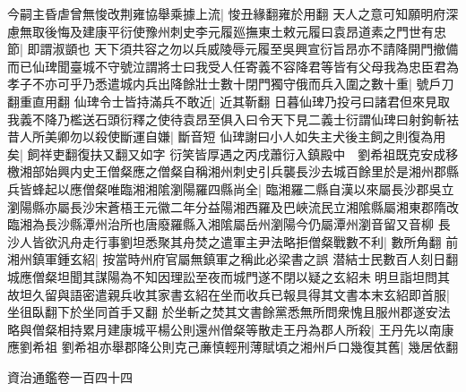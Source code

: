 今嗣主昏虐曾無悛改荆雍協舉乘據上流|{
	悛丑緣翻雍於用翻}
天人之意可知願明府深慮無取後悔及建康平衍使豫州刺史李元履廵撫東土敕元履曰袁昂道素之門世有忠節|{
	即謂淑顗也}
天下須共容之勿以兵威陵辱元履至吳興宣衍旨昂亦不請降開門撤備而已仙琕聞臺城不守號泣謂將士曰我受人任寄義不容降君等皆有父母我為忠臣君為孝子不亦可乎乃悉遣城内兵出降餘壯士數十閉門獨守俄而兵入圍之數十重|{
	號戶刀翻重直用翻}
仙琕令士皆持滿兵不敢近|{
	近其靳翻}
日暮仙琕乃投弓曰諸君但來見取我義不降乃檻送石頭衍釋之使待袁昂至俱入曰令天下見二義士衍謂仙琕曰射鉤斬袪昔人所美卿勿以殺使斷運自嫌|{
	斷音短}
仙琕謝曰小人如失主犬後主飼之則復為用矣|{
	飼祥吏翻復扶又翻又如字}
衍笑皆厚遇之丙戌蕭衍入鎮殿中　劉希祖既克安成移檄湘部始興内史王僧粲應之僧粲自稱湘州刺史引兵襲長沙去城百餘里於是湘州郡縣兵皆蜂起以應僧粲唯臨湘湘隂瀏陽羅四縣尚全|{
	臨湘羅二縣自漢以來屬長沙郡吳立瀏陽縣亦屬長沙宋蒼梧王元徽二年分益陽湘西羅及巴峽流民立湘隂縣屬湘東郡隋改臨湘為長沙縣潭州治所也唐廢羅縣入湘隂屬岳州瀏陽今仍屬潭州瀏音留又音柳}
長沙人皆欲汎舟走行事劉坦悉聚其舟焚之遣軍主尹法略拒僧粲戰數不利|{
	數所角翻}
前湘州鎮軍鍾玄紹|{
	按當時州府官屬無鎮軍之稱此必梁書之誤}
潜結士民數百人刻日翻城應僧粲坦聞其謀陽為不知因理訟至夜而城門遂不閉以疑之玄紹未明旦詣坦問其故坦久留與語密遣親兵收其家書玄紹在坐而收兵已報具得其文書本末玄紹即首服|{
	坐徂臥翻下於坐同首手又翻}
於坐斬之焚其文書餘黨悉無所問衆愧且服州郡遂安法略與僧粲相持累月建康城平楊公則還州僧粲等散走王丹為郡人所殺|{
	王丹先以南康應劉希祖}
劉希祖亦舉郡降公則克己亷慎輕刑薄賦頃之湘州戶口幾復其舊|{
	幾居依翻}


資治通鑑卷一百四十四
